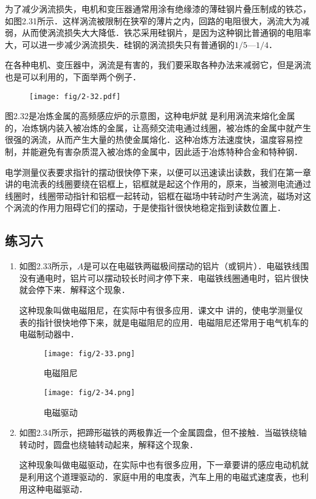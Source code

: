 为了减少涡流损失，电机和变压器通常用涂有绝缘漆的薄硅钢片叠压制成的铁芯，如图2.31所示．这样涡流被限制在狭窄的薄片之内，回路的电阻很大，涡流大为减弱，从而使涡流损失大大降低．铁芯采用硅钢片，是因为这种钢比普通钢的电阻率大，可以进一步减少涡流损失．硅钢的涡流损失只有普通钢的$1/5$—$1/4$．

在各种电机、变压器中，涡流是有害的，我们要采取各种办法来减弱它，但是涡流也是可以利用的，下面举两个例子．

\begin{figure}[htp]
    \centering
    \texttt{[image: fig/2-32.pdf]}
    \caption{}
\end{figure}

图2.32是冶炼金属的高频感应炉的示意图，这种电炉就
是利用涡流来熔化金属的，冶炼锅内装入被冶炼的金属，让高频交流电通过线圈，被冶炼的金属中就产生很强的涡流，从而产生大量的热使金属熔化．这种冶炼方法速度快，温度容易控制，并能避免有害杂质混入被冶炼的金属中，因此适于冶炼特种合金和特种钢．

电学测量仪表要求指针的摆动很快停下来，以便可以迅速读出读数，我们在第一章讲的电流表的线圈要绕在铝框上，铝框就是起这个作用的，原来，当被测电流通过线圈时，线圈带动指针和铝框一起转动，铝框在磁场中转动时产生涡流，磁场对这个涡流的作用力阻碍它们的摆动，于是使指针很快地稳定指到读数位置上．

\subsection*{练习六}
\begin{enumerate}
    \item 如图2.33所示，$A$是可以在电磁铁两磁极间摆动的铝片（或铜片）．电磁铁线围没有通电时，铝片可以摆动较长时间才停下来．电磁铁线圈通电时，铝片很快就会停下来．解释这个现象．
    
这种现象叫做电磁阻尼，在实际中有很多应用．课文中
讲的，使电学测量仪表的指针很快地停下来，就是电磁阻尼的应用．电磁阻尼还常用于电气机车的电磁制动器中．
\begin{figure}[htp]
\centering
\begin{minipage}[t]{0.48\textwidth}
\centering
\texttt{[image: fig/2-33.png]}
\caption{电磁阻尼}
\end{minipage}
\begin{minipage}[t]{0.48\textwidth}
\centering
\texttt{[image: fig/2-34.png]}
\caption{电磁驱动}
\end{minipage}
\end{figure}
\item 如图2.34所示，把蹄形磁铁的两极靠近一个金属圆盘，但不接触．当磁铁绕轴转动时，圆盘也绕轴转动起来，解释这个现象．

这种现象叫做电磁驱动，在实际中也有很多应用，下一章要讲的感应电动机就是利用这个道理驱动的．家庭中用的电度表，汽车上用的电磁式速度表，也利用这种电磁驱动．
\end{enumerate}

